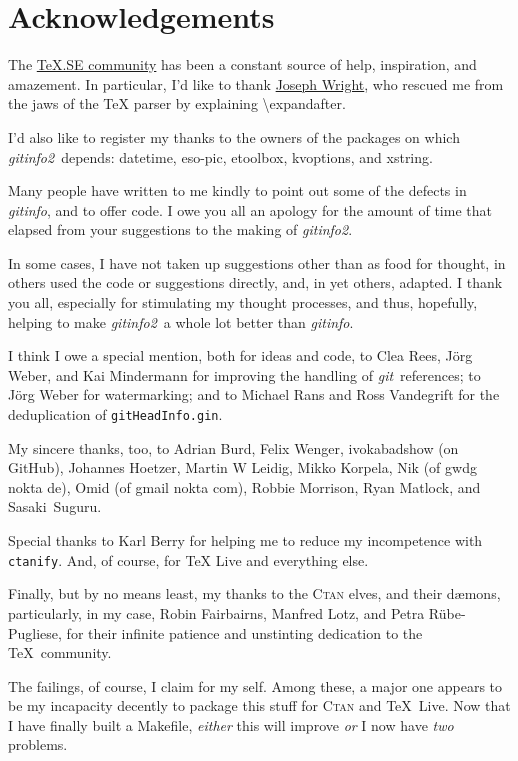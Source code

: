 \documentclass[a4paper,12pt,twoside,openany]{memoir}
\newcommand{\sfit}[1]{\textit{#1}}
\newcommand{\git}{\sfit{git}}
\newcommand{\opname}{\sfit{gitinfo}}
\newcommand{\tpname}{\sfit{gitinfo2}}
\newcommand{\ginname}{gitHeadInfo.gin}
\newcommand{\metaname}{\texttt{\ginname}}
\begin{document}
\clearpage
\section{Acknowledgements}

The \href{http://tex.stackexchange.com}{\TeX.SE community}
has been a constant source of help, inspiration, and amazement.
In particular, I'd like to thank
\href{http://tex.stackexchange.com/users/73/joseph-wright}{Joseph Wright},
who rescued me from the jaws of the TeX parser by explaining
\textbackslash expandafter.

I'd also like to register my thanks to the owners of the packages on which
\tpname\ depends: datetime, eso-pic, etoolbox, kvoptions, and xstring.

Many people have written to me kindly
to point out some of the defects in \opname, and to offer code.
I owe you all an apology for the amount of time that elapsed
from your suggestions to the making of \tpname.

In some cases, I have not taken up suggestions other than as food for thought,
in others used the code or suggestions directly, and,
in yet others, adapted.
I thank you all, especially for stimulating my thought processes,
and thus, hopefully,
helping to make \tpname\ a whole lot better than \opname.

I think I owe a special mention, both for ideas and code,
to Clea Rees, Jörg Weber, and Kai Mindermann
for improving the handling of \git\ references;
to Jörg Weber for watermarking;
and to Michael Rans and Ross Vandegrift for
the deduplication of \metaname.

My sincere thanks, too, to
Adrian Burd,
Felix Wenger,
ivokabadshow (on GitHub),
Johannes Hoetzer,
Martin W Leidig,
Mikko Korpela,
Nik (of gwdg nokta de),
Omid (of gmail nokta com),
Robbie Morrison,
Ryan Matlock, and
Sasaki~Suguru.

Special thanks to Karl Berry for helping me to
reduce my incompetence with \texttt{ctanify}.
And, of course, for \TeX{} Live and everything else.

Finally, but by no means least,
my thanks to the \textsc{Ctan} elves, and their dæmons,
particularly, in my case,
Robin Fairbairns, Manfred Lotz, and Petra Rübe-Pugliese,
for their infinite patience and unstinting
dedication to the \TeX\ community.

The failings, of course, I claim for my self.
Among these, a major one appears to be my incapacity
decently to package this stuff for
\textsc{Ctan} and \TeX{}~Live.
Now that I have finally built a Makefile,
\emph{either} this will improve \emph{or}
I now have \emph{two} problems.
\clearpage
\end{document}

